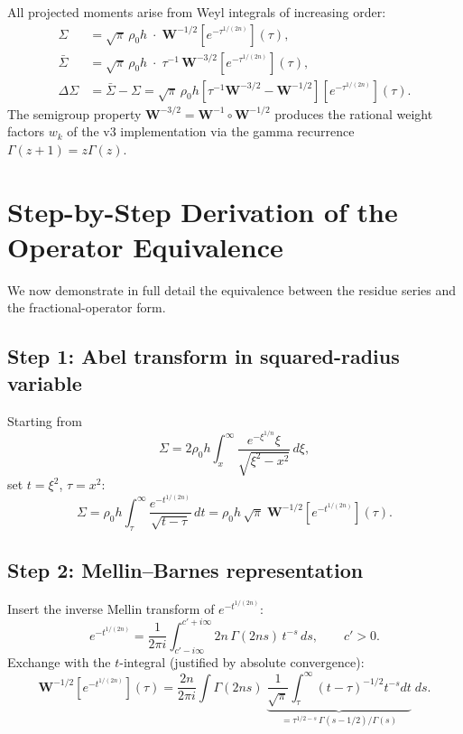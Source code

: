\documentclass{article}
\begin{document}
All projected moments arise from Weyl integrals of increasing order:
\begin{equation}\label{eq:hierarchy}
\begin{aligned}
\Sigma &= \sqrt\pi\,\rho_0 h\;\cdot\;\mathbf{W}^{-1/2}[e^{-\tau^{1/(2n)}}](\tau),\\
\bar\Sigma &= \sqrt\pi\,\rho_0 h\;\cdot\;\tau^{-1}\,\mathbf{W}^{-3/2}[e^{-\tau^{1/(2n)}}](\tau),\\
\Delta\Sigma &= \bar\Sigma - \Sigma
= \sqrt\pi\,\rho_0 h\left[\tau^{-1}\mathbf{W}^{-3/2}-\mathbf{W}^{-1/2}\right]
[e^{-\tau^{1/(2n)}}](\tau).
\end{aligned}
\end{equation}
The semigroup property $\mathbf{W}^{-3/2}=\mathbf{W}^{-1}\circ\mathbf{W}^{-1/2}$
produces the rational weight factors $w_k$ of the v3 implementation via the
gamma recurrence $\Gamma(z+1)=z\Gamma(z)$.

\section{Step-by-Step Derivation of the Operator Equivalence}
\label{sec:derivation}

We now demonstrate in full detail the equivalence between the residue series
and the fractional-operator form.

\subsection{Step 1: Abel transform in squared-radius variable}

Starting from
\[
\Sigma = 2\rho_0 h\int_x^\infty
\frac{e^{-\xi^{1/n}}\xi}{\sqrt{\xi^2-x^2}}\,d\xi,
\]
set $t=\xi^2$, $\tau=x^2$:
\[
\Sigma = \rho_0 h\int_\tau^\infty
\frac{e^{-t^{1/(2n)}}}{\sqrt{t-\tau}}\,dt
= \rho_0 h\,\sqrt\pi\;\mathbf{W}^{-1/2}[e^{-t^{1/(2n)}}](\tau).
\]

\subsection{Step 2: Mellin--Barnes representation}

Insert the inverse Mellin transform of $e^{-t^{1/(2n)}}$:
\[
e^{-t^{1/(2n)}} = \frac{1}{2\pi i}\int_{c'-i\infty}^{c'+i\infty}
2n\,\Gamma(2ns)\,t^{-s}\,ds,\qquad c'>0.
\]
Exchange with the $t$-integral (justified by absolute convergence):
\[
\mathbf{W}^{-1/2}[e^{-t^{1/(2n)}}](\tau)
= \frac{2n}{2\pi i}\int \Gamma(2ns)\;
\underbrace{\frac{1}{\sqrt\pi}\int_\tau^\infty(t-\tau)^{-1/2}t^{-s}dt}_{
  = \tau^{1/2-s}\,\Gamma(s-1/2)/\Gamma(s)}\;ds.
\]
\end{document}
